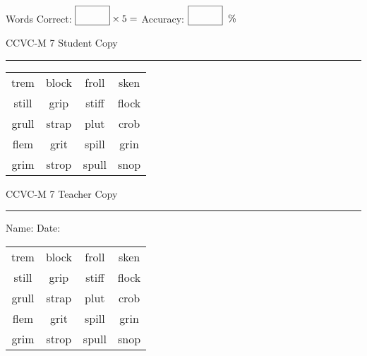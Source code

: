 \documentclass{memoir}
\begin{document}
\small

Words Correct: $\fbox{\phantom{\huge 100}} \times 5 = $ Accuracy: $\fbox{\phantom{\huge 100}}\;\; \%$ 

\vfill

\newpage


\footnotesize \noindent
CCVC-M 7 \hfill Student Copy
\smallskip
\hrule

\Large

\setlength{\tabcolsep}{14pt}
\def\arraystretch{3}

{\selectfont


\begin{vplace}[0.5]
\begin{center}
\begin{tabular}{cccc}
trem & block & froll & sken \\
still & grip      & stiff & flock \\
grull            & strap & plut & crob \\
flem & grit      & spill & grin     \\
grim       & strop & spull & snop \\
\end{tabular}
\end{center}
\end{vplace}

}

\newpage

\footnotesize \noindent
CCVC-M 7 \hfill Teacher Copy
\smallskip
\hrule

\small

\vfill

\noindent
Name: \underline{\hspace{1.75in}} \hfill Date: \underline{\hspace{1in}}

\Large

{\selectfont


\begin{vplace}[0.5]
\begin{center}
\begin{tabular}{cccc}
trem & block & froll & sken \\
still & grip      & stiff & flock \\
grull            & strap & plut & crob \\
flem & grit      & spill & grin     \\
grim       & strop & spull & snop \\
\end{tabular}
\end{center}
\end{vplace}



}
\end{document}
